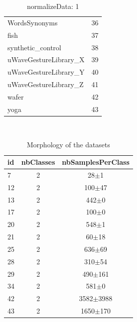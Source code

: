 \documentclass[12pt,a4paper,fleqn]{tufte-handout}
\begin{document}
\begin{table}
\begin{center}
\begin{tabular}{lc}
WordsSynonyms & 36 \\       
fish & 37 \\       
synthetic\_control & 38 \\       
uWaveGestureLibrary\_X & 39 \\       
uWaveGestureLibrary\_Y & 40 \\       
uWaveGestureLibrary\_Z & 41 \\       
wafer & 42 \\       
yoga & 43 \\       
\end{tabular}       
\end{center}       
\caption{normalizeData: 1}       
\label{noda1}       
\end{table}       
 
 
\begin{table}      
\begin{center}      
\      
\setlength{\tabcolsep}{.16667em}      
\begin{tabular}{lcc}      
id & nbClasses & nbSamplesPerClass \\      
\hline      
7 & 2 &      28$\pm$1 \\      
12 & 2 &    100$\pm$47 \\      
13 & 2 &     442$\pm$0 \\      
17 & 2 &     100$\pm$0 \\      
20 & 2 &     548$\pm$1 \\      
21 & 2 &     60$\pm$18 \\      
25 & 2 &    636$\pm$69 \\      
28 & 2 &    310$\pm$54 \\      
29 & 2 &   490$\pm$161 \\      
34 & 2 &     581$\pm$0 \\      
42 & 2 & 3582$\pm$3988 \\      
43 & 2 &  1650$\pm$170 \\      
\end{tabular}      
\end{center}      
\caption{Morphology of the datasets}      
\label{didtNoda1}      
\end{table}      
 
\end{document}
